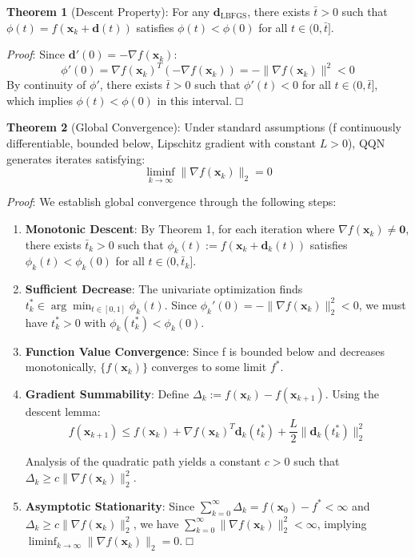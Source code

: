 \textbf{Theorem 1} (Descent Property): For any \(\mathbf{d}_{\text{LBFGS}}\), there exists \(\bar{t} > 0\) such that \(\phi(t) = f(\mathbf{x}_k + \mathbf{d}(t))\) satisfies \(\phi(t) < \phi(0)\) for all \(t \in (0, \bar{t}]\).

\emph{Proof}: Since \(\mathbf{d}'(0) = -\nabla f(\mathbf{x}_k)\):
\[\phi'(0) = \nabla f(\mathbf{x}_k)^T (-\nabla f(\mathbf{x}_k)) = -\|\nabla f(\mathbf{x}_k)\|^2 < 0\]
By continuity of \(\phi'\), there exists \(\bar{t} > 0\) such that \(\phi'(t) < 0\) for all \(t \in (0, \bar{t}]\), which implies \(\phi(t) < \phi(0)\) in this interval. □

\textbf{Theorem 2} (Global Convergence): Under standard assumptions (f continuously differentiable, bounded below, Lipschitz gradient with constant \(L > 0\)), QQN generates iterates satisfying:
\[\liminf_{k \to \infty} \|\nabla f(\mathbf{x}_k)\|_2 = 0\]

\emph{Proof}: We establish global convergence through the following steps:

\begin{enumerate}
\def\labelenumi{\arabic{enumi}.}
\item
  \textbf{Monotonic Descent}: By Theorem 1, for each iteration where \(\nabla f(\mathbf{x}_k) \neq \mathbf{0}\), there exists \(\bar{t}_k > 0\) such that \(\phi_k(t) := f(\mathbf{x}_k + \mathbf{d}_k(t))\) satisfies \(\phi_k(t) < \phi_k(0)\) for all \(t \in (0, \bar{t}_k]\).
\item
  \textbf{Sufficient Decrease}: The univariate optimization finds \(t_k^* \in \arg\min_{t \in [0,1]} \phi_k(t)\).
  Since \(\phi_k'(0) = -\|\nabla f(\mathbf{x}_k)\|_2^2 < 0\), we must have \(t_k^* > 0\) with \(\phi_k(t_k^*) < \phi_k(0)\).
\item
  \textbf{Function Value Convergence}: Since f is bounded below and decreases monotonically, \(\{f(\mathbf{x}_k)\}\) converges to some limit \(f^*\).
\item
  \textbf{Gradient Summability}: Define \(\Delta_k := f(\mathbf{x}_k) - f(\mathbf{x}_{k+1})\). Using the descent lemma:
  \[f(\mathbf{x}_{k+1}) \leq f(\mathbf{x}_k) + \nabla f(\mathbf{x}_k)^T \mathbf{d}_k(t_k^*) + \frac{L}{2}\|\mathbf{d}_k(t_k^*)\|_2^2\]

  Analysis of the quadratic path yields a constant \(c > 0\) such that \(\Delta_k \geq c\|\nabla f(\mathbf{x}_k)\|_2^2\).
\item
  \textbf{Asymptotic Stationarity}: Since \(\sum_{k=0}^{\infty} \Delta_k = f(\mathbf{x}_0) - f^* < \infty\) and
  \(\Delta_k \geq c\|\nabla f(\mathbf{x}_k)\|_2^2\), we have \(\sum_{k=0}^{\infty} \|\nabla f(\mathbf{x}_k)\|_2^2 < \infty\),
  implying \(\liminf_{k \to \infty} \|\nabla f(\mathbf{x}_k)\|_2 = 0\). □
\end{enumerate}

